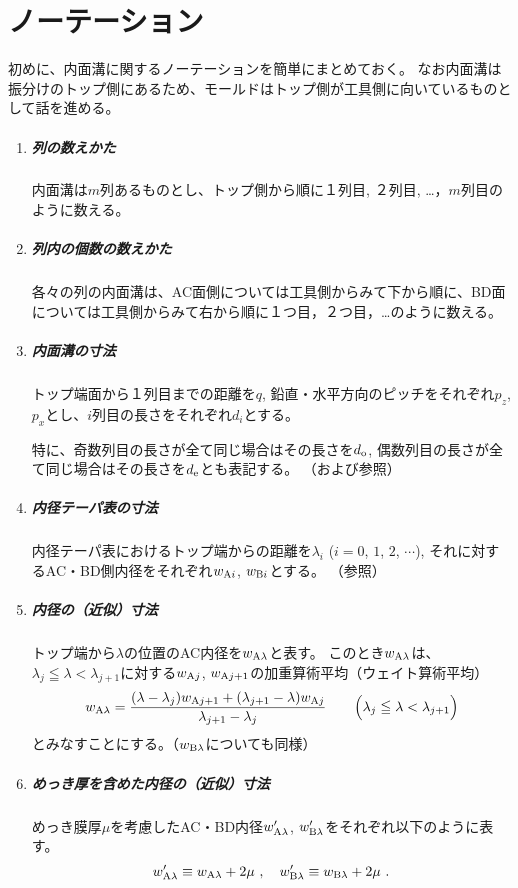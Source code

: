\section{ノーテーション}
初めに、内面溝に関するノーテーションを簡単にまとめておく。
なお内面溝は振分けのトップ側にあるため、モールドはトップ側が工具側に向いているものとして話を進める。
\begin{tcolorbox}[title={内面溝に関するノーテーション}, fonttitle=\gtfamily\bfseries, breakable, enhanced jigsaw]
\begin{enumerate}
\item
\subparagraph{列の数えかた}
内面溝は$m$列あるものとし、トップ側から順に１列目, ２列目, …，$m$列目のように数える。

\item
\subparagraph{列内の個数の数えかた}
各々の列の内面溝は、AC面側については工具側からみて下から順に、BD面については工具側からみて右から順に１つ目，２つ目，…のように数える。

\item
\subparagraph{内面溝の寸法}
トップ端面から１列目までの距離を$q$, 鉛直・水平方向のピッチをそれぞれ$p_z$, $p_x$とし、$i$列目の長さをそれぞれ$d_i$とする。

特に、奇数列目の長さが全て同じ場合はその長さを$d_\text o$, 偶数列目の長さが全て同じ場合はその長さを$d_\text e$とも表記する。
（および参照）

\item
\subparagraph{内径テーパ表の寸法}
内径テーパ表におけるトップ端からの距離を$\lambda_i$ ($i = 0$, $1$, $2$, $\cdots$), それに対するAC・BD側内径をそれぞれ$w_{\text Ai}$, $w_{\text Bi}$とする。
（参照）

\item
\subparagraph{内径の（近似）寸法}
トップ端から$\lambda$の位置のAC内径を$w_{\text A\lambda}$と表す。
このとき$w_{\text A\lambda}$は、$\lambda_j \leqq \lambda < \lambda_{j+1}$に対する$w_{\text Aj}$, $w_{\text Aj+1}$の加重算術平均（ウェイト算術平均）
\begin{align*}
  w_{\text A\lambda}
   = \frac{(\lambda-\lambda_j)w_{\text Aj+1}+(\lambda_{j+1}-\lambda)w_{\text Aj}}{\lambda_{j+1}-\lambda_j} \qquad
  \Big(\lambda_j \leqq \lambda < \lambda_{j+1}\Big)
\end{align*}
とみなすことにする。（$w_{\text B\lambda}$についても同様）

\item
\subparagraph{めっき厚を含めた内径の（近似）寸法}
めっき膜厚$\mu$を考慮したAC・BD内径$w'_{\text A\lambda}$, $w'_{\text B\lambda}$をそれぞれ以下のように表す。
\begin{align*}
  w'_{\text A\lambda} \equiv w_{\text A\lambda}+2\mu~, \quad
  w'_{\text B\lambda} \equiv w_{\text B\lambda}+2\mu~.
\end{align*}
\end{enumerate}
\end{tcolorbox}\noindent
